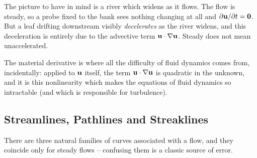 \documentclass[a4paper]{scrartcl}
\newcommand{\D}{\mathrm{D}}
\begin{document}
\begin{center}
\end{center}

The picture to have in mind is a river which widens as it flows. The flow is steady, so a probe fixed to the bank sees nothing changing at all and $\partial \mathbf{u}/\partial t = \mathbf{0}$. But a leaf drifting downstream visibly \emph{decelerates} as the river widens, and this deceleration is entirely due to the advective term $\mathbf{u} \cdot \nabla \mathbf{u}$. Steady does not mean unaccelerated.

The material derivative is where all the difficulty of fluid dynamics comes from, incidentally: applied to $\mathbf{u}$ itself, the term $\mathbf{u} \cdot \nabla \mathbf{u}$ is quadratic in the unknown, and it is this nonlinearity which makes the equations of fluid dynamics so intractable (and which is responsible for turbulence).

\subsection{Streamlines, Pathlines and Streaklines}

There are three natural families of curves associated with a flow, and they coincide only for steady flows -- confusing them is a classic source of error.
\end{document}
